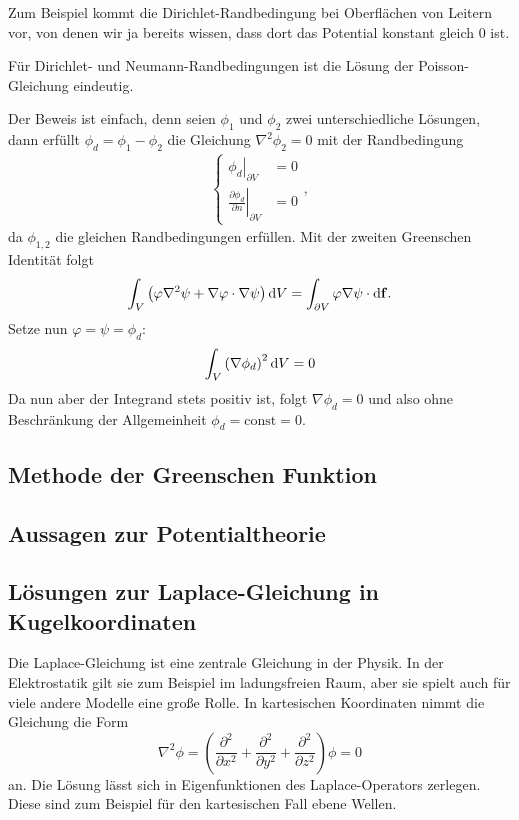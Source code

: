Zum Beispiel kommt die Dirichlet-Randbedingung bei Oberflächen von Leitern vor, von denen wir ja bereits wissen, dass dort das Potential konstant gleich $0$ ist.
\begin{formal}
	Für Dirichlet- und Neumann-Randbedingungen ist die Lösung der Poisson-Gleichung eindeutig.
\end{formal}
Der Beweis ist einfach, denn seien $\phi _{1}$ und $\phi _{2}$ zwei unterschiedliche Lösungen, dann erfüllt $\phi _{d}=\phi _{1}-\phi _{2}$ die Gleichung $\nabla ^{2}\phi _{2}=0$ mit der Randbedingung
\begin{align*}
	\begin{cases} \left.\phi _{d}\right| _{\partial V}                             & =0 \\
              \left.\frac{\partial \phi _{d}}{\partial n}\right| _{\partial V} & =0
	\end{cases} ,
\end{align*}
da $\phi _{1,2}$ die gleichen Randbedingungen erfüllen. Mit der zweiten Greenschen Identität folgt
\begin{equation*}
	\int _{V}\left(\varphi \nabla ^{2}\psi +\nabla \varphi \cdot \nabla \psi \right)\text{d} V=\int _{\partial V}\varphi \nabla \psi \cdot \text{d} \mathbf{f}.
\end{equation*}
Setze nun $\varphi =\psi =\phi _{d}$:
\begin{equation*}
	\int _{V}\left(\nabla \phi _{d}\right)^{2}\text{d} V=0
\end{equation*}
Da nun aber der Integrand stets positiv ist, folgt $\nabla \phi _{d}=0$ und also ohne Beschränkung der Allgemeinheit $\phi _{d}=\text{const}=0$.


\subsection{Methode der Greenschen Funktion}

\subsection{Aussagen zur Potentialtheorie}

\subsection{Lösungen zur Laplace-Gleichung in Kugelkoordinaten}

Die Laplace-Gleichung ist eine zentrale Gleichung in der Physik. In der Elektrostatik gilt sie zum Beispiel im ladungsfreien Raum, aber sie spielt auch für viele andere Modelle eine große Rolle. In kartesischen Koordinaten nimmt die Gleichung die Form
\begin{equation*}
	\nabla ^{2}\phi =\left(\frac{\partial ^{2}}{\partial x^{2}}+\frac{\partial ^{2}}{\partial y^{2}}+\frac{\partial ^{2}}{\partial z^{2}}\right)\phi =0
\end{equation*}
an. Die Lösung lässt sich in Eigenfunktionen des Laplace-Operators zerlegen. Diese sind zum Beispiel für den kartesischen Fall ebene Wellen.


